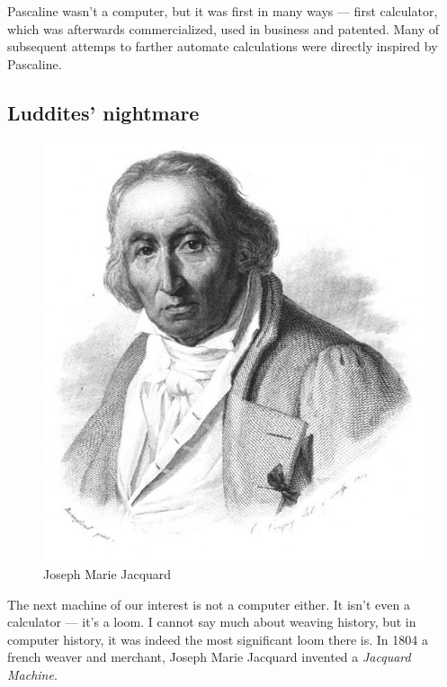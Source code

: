\documentclass[../../what-is-computer]{subfiles}
\begin{document}
    Pascaline wasn't a computer, but it was first in many ways --- first calculator, which was afterwards commercialized, used in business and patented. Many of 
    subsequent attemps to farther automate calculations were directly inspired by Pascaline. \par

    \subsection{Luddites' nightmare}\label{subsection:luddites-nightmare}

    \begin{figure}
        \centering
        \includegraphics[scale=0.2]{images/persons/person_joseph_jacquard.jpg}
        \caption{Joseph Marie Jacquard}
    \end{figure}

    The next machine of our interest is not a computer either. It isn't even a calculator --- it's a loom. I cannot say much about weaving history, 
    but in computer history, it was indeed the most significant loom there is. In 1804 a french weaver and merchant, Joseph Marie Jacquard invented a \emph{Jacquard Machine}. \par
\end{document}
